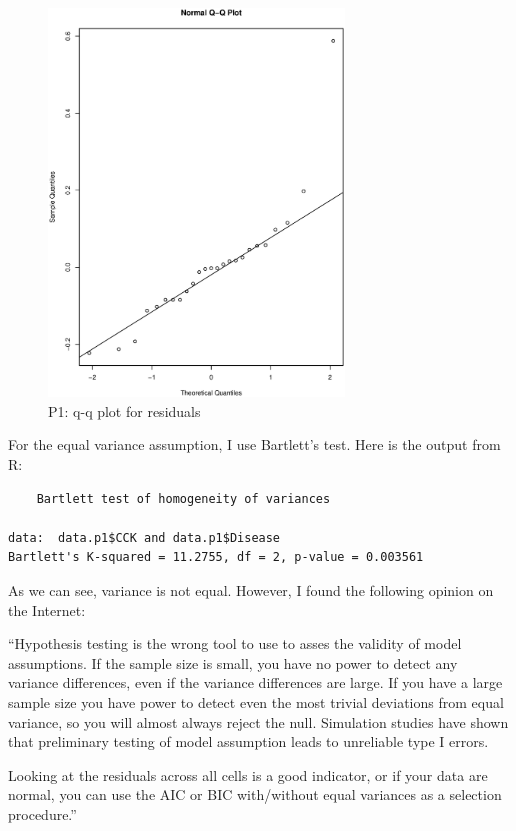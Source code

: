 \documentclass[12pt]{article}
\begin{document}
\begin{figure}[ht!]
  \centering
  \includegraphics[width=0.7\textwidth]{qq}
  \caption{P1: q-q plot for residuals\label{fig:qq}}
\end{figure}

For the equal variance assumption, I use Bartlett's test. Here is the
output from R:

\begin{verbatim}
	Bartlett test of homogeneity of variances

data:  data.p1$CCK and data.p1$Disease 
Bartlett's K-squared = 11.2755, df = 2, p-value = 0.003561
\end{verbatim}

As we can see, variance is not equal. However, I found the following
opinion on the Internet:

``Hypothesis testing is the wrong tool to use to asses the validity of
model assumptions. If the sample size is small, you have no power to
detect any variance differences, even if the variance differences are
large. If you have a large sample size you have power to detect even
the most trivial deviations from equal variance, so you will almost
always reject the null. Simulation studies have shown that preliminary
testing of model assumption leads to unreliable type I errors.

Looking at the residuals across all cells is a good indicator, or if
your data are normal, you can use the AIC or BIC with/without equal
variances as a selection procedure.''
\end{document}
